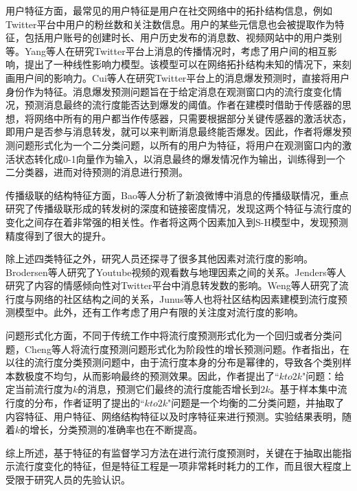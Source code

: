 用户特征方面，最常见的用户特征是用户在社交网络中的拓扑结构信息，例如Twitter平台中用户的粉丝数和关注数信息\citep{gupta2012predicting,zhao2013short,kupavskii2013predicting,kong2014predicting}。用户的某些元信息也会被提取作为特征，包括用户账号的创建时长、用户历史发布的消息数\citep{suh2010want}、视频网站中的用户类别\citep{borghol2012untold}等。Yang等人\citep{yang2010modeling}在研究Twitter平台上消息的传播情况时，考虑了用户间的相互影响，提出了一种线性影响力模型。该模型可以在网络拓扑结构未知的情况下，来刻画用户间的影响力。Cui等人\citep{cui2013cascading}在研究Twitter平台上的消息爆发预测时，直接将用户身份作为特征。消息爆发预测问题旨在于给定消息在观测窗口内的流行度变化情况，预测消息最终的流行度能否达到爆发的阈值。作者在建模时借助于传感器的思想，将网络中所有的用户都当作传感器，只需要根据部分关键传感器的激活状态，即用户是否参与消息转发，就可以来判断消息最终能否爆发。因此，作者将爆发预测问题形式化为一个二分类问题，以所有的用户为特征，将用户在观测窗口内的激活状态转化成0-1向量作为输入，以消息最终的爆发情况作为输出，训练得到一个二分类器，进而对待预测的消息进行预测。

传播级联的结构特征方面，Bao等人\citep{bao2013popularity}分析了新浪微博中消息的传播级联情况，重点研究了传播级联形成的转发树的深度和链接密度情况，发现这两个特征与流行度的变化之间存在着非常强的相关性。作者将这两个因素加入到S-H模型中，发现预测精度得到了很大的提升。

除上述四类特征之外，研究人员还探寻了很多其他因素对流行度的影响。Brodersen等人\citep{brodersen2012youtube}研究了Youtube视频的观看数与地理因素之间的关系。Jenders等人\citep{jenders2013analyzing}研究了内容的情感倾向性对Twitter平台中消息转发数的影响。Weng等人\citep{weng2013virality}研究了流行度与网络的社区结构之间的关系，Junus等人\citep{junus2015community}也将社区结构因素建模到流行度预测模型中。此外，还有工作考虑了用户有限的关注度对流行度的影响\citep{hodas2012visibility,weng2012competition}。

问题形式化方面，不同于传统工作中将流行度预测形式化为一个回归或者分类问题，Cheng等人\citep{cheng2014can}将流行度预测问题形式化为阶段性的增长预测问题。作者指出，在以往的流行度分类预测问题中，由于流行度本身的分布是幂律的，导致各个类别样本数极度不均匀，从而影响最终的预测效果。因此，作者提出了``$kto2k$"问题：给定当前流行度为$k$的消息，预测它们最终的流行度能否增长到$2k$。基于样本集中流行度的分布，作者证明了提出的``$kto2k$"问题是一个均衡的二分类问题，并抽取了内容特征、用户特征、网络结构特征以及时序特征来进行预测。实验结果表明，随着$k$的增长，分类预测的准确率也在不断提高。

综上所述，基于特征的有监督学习方法在进行流行度预测时，关键在于抽取出能指示流行度变化的特征，但是特征工程是一项非常耗时耗力的工作，而且很大程度上受限于研究人员的先验认识。

